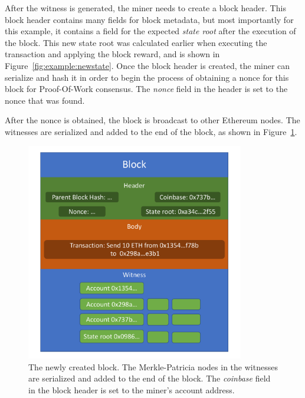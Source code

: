 \documentclass[12pt]{article}
\newcommand{\figurewidth}{0.85\textwidth}
\begin{document}
After the witness is generated, the miner needs to create a block header. This block header contains many fields for block metadata, but most importantly for this example, it contains a field for the expected \emph{state root} after the execution of the block. This new state root was calculated earlier when executing the transaction and applying the block reward, and is shown in Figure~\ref{fig:example:newstate}. Once the block header is created, the miner can serialize and hash it in order to begin the process of obtaining a nonce for this block for Proof-Of-Work consensus. The \emph{nonce} field in the header is set to the nonce that was found.

After the nonce is obtained, the block is broadcast to other Ethereum nodes. The witnesses are serialized and added to the end of the block, as shown in Figure~\ref{fig:example:block}.

\begin{figure}[H]
  \centering
  \includegraphics[width=\figurewidth]{../figures/design/example_block.pdf}
  \caption{The newly created block. The Merkle-Patricia nodes in the witnesses are serialized and added to the end of the block. The \emph{coinbase} field in the block header is set to the miner's account address.}
  \label{fig:example:block}
\end{figure}
\end{document}
